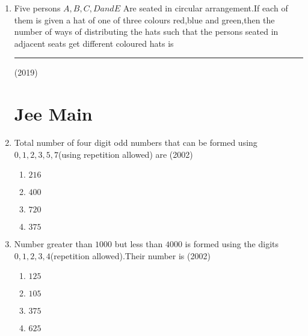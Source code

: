 \documentclass[journal,12pt,twocolumn]{IEEEtran}
\theoremstyle{remark}
\begin{document}
\begin{enumerate}
\item Five persons $A,B,C,D and E$ Are seated in circular arrangement.If each of them is given a hat of one of three colours red,blue and green,then the number of ways of distributing the hats such that the persons seated in adjacent seats get different coloured hats is \rule{1cm}{0.15mm}
\hfill(2019)\\

\section{Jee Main}

\item Total number of four digit odd numbers that can be formed using $0,1,2,3,5,7$(using repetition allowed) are 
\hfill(2002)
\begin{enumerate}

    \item $216$
    
    \item $400$
    \item $720$
    \item $375$\\
\end{enumerate}

\item Number greater than $1000$ but less than $4000$ is  formed using the digits $0,1,2,3,4$(repetition allowed).Their number is
\hfill(2002)\\
\begin{enumerate}
    \item $125$
    \item $105$
    \item $375$
    \item $625$
\end{enumerate}


\end{enumerate}
\end{document}
